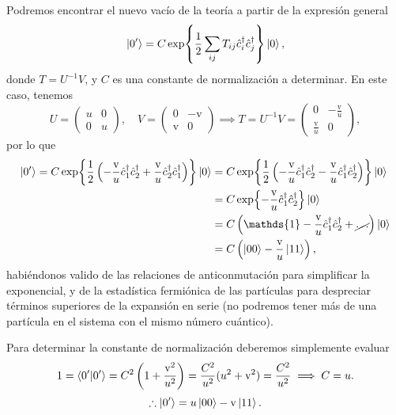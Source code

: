 \documentclass{scrartcl}
\newcommand{\inv}[1]{\frac{1}{#1}}
\renewcommand{\c}{\hat{c}}
\DeclareRobustCommand{\[}{\begin{equation}}
\DeclareRobustCommand{\]}{\end{equation}}
\begin{document}
\begin{enumerate}
\begin{enumerate}
\begin{enumerate}[(i)]
            Podremos encontrar el nuevo vacío de la teoría a partir de la expresión general
            \[ \ket{0'} = C \exp{\inv{2} \sum_{ij} T_{ij} \c_i^\dagger \c_j^\dagger} \ket{0}, \]
            donde $T = U^{-1} V$, y $C$ es una constante de normalización a determinar. En este caso, tenemos
            \[ U = \begin{pmatrix} u & 0 \\ 0 & u \end{pmatrix}, \quad V = \begin{pmatrix} 0 & -\mathrm{v} \\ \mathrm{v} & 0 \end{pmatrix} \implies T = U^{-1} V = \begin{pmatrix} 0 & -\frac{\mathrm{v}}{u} \\ \frac{\mathrm{v}}{u} & 0 \end{pmatrix}, \]
            por lo que
            \begin{align}
                \ket{0'} = C \exp{\inv{2} \left( -\frac{\mathrm{v}}{u} \c_1^\dagger \c_2^\dagger + \frac{\mathrm{v}}{u} \c_2^\dagger \c_1^\dagger \right)} \ket{0} &= C \exp{\inv{2} \left( -\frac{\mathrm{v}}{u} \c_1^\dagger \c_2^\dagger - \frac{\mathrm{v}}{u} \c_1^\dagger \c_2^\dagger \right)} \ket{0} \\
                    &= C \exp{-\frac{\mathrm{v}}{u} \c_1^\dagger \c_2^\dagger} \ket{0} \\
                    &= C \left( \mathds{1} - \frac{\mathrm{v}}{u} \c_1^\dagger \c_2^\dagger + \cancel{\dots} \right) \ket{0} \\
                    &= C \left( \ket{00} - \frac{\mathrm{v}}{u} \ket{11} \right),
            \end{align}
            habiéndonos valido de las relaciones de anticonmutación para simplificar la exponencial, y de la estadística fermiónica de las partículas para despreciar términos superiores de la expansión en serie (no podremos tener más de una partícula en el sistema con el mismo número cuántico).
            
            Para determinar la constante de normalización deberemos simplemente evaluar
            \[ 1 = \ip{0'}{0'} = C^2 \left( 1 + \frac{\mathrm{v}^2}{u^2} \right) = \frac{C^2}{u^2} (u^2 + \mathrm{v}^2) = \frac{C^2}{u^2} \implies C = u. \]
            \[ \therefore \ket{0'} = u \ket{00} - \mathrm{v} \ket{11}. \]
            

\end{enumerate}
\end{enumerate}
\end{enumerate}
\end{document}
